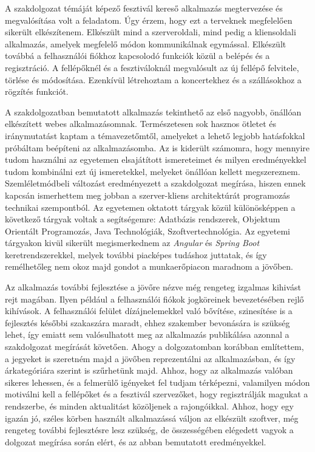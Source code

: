 
A szakdolgozat témáját képező fesztivál kereső alkalmazás megtervezése és megvalósítása volt a feladatom. Úgy érzem, hogy ezt a terveknek megfelelően sikerült elkészítenem. Elkészült mind a szerveroldali, mind pedig a kliensoldali alkalmazás, amelyek megfelelő módon kommunikálnak egymással. Elkészült továbbá a felhasználói fiókhoz kapcsolodó funkciók közül a belépés és a regisztráció. A fellépőknél és a fesztiváloknál megvalósult az új fellépő felvitele, törlése és módosítása. Ezenkívül létrehoztam a koncertekhez és a szállásokhoz a rögzítés funkciót.

A szakdolgozatban bemutatott alkalmazás tekinthető az első nagyobb, önállóan elkészített webes alkalmazásomnak. Természetesen sok hasznos ötletet és iránymutatást kaptam a témavezetőmtől, amelyeket a lehető legjobb hatásfokkal próbáltam beépíteni az alkalmazásomba. Az is kiderült számomra, hogy mennyire tudom használni az egyetemen elsajátított ismereteimet és milyen eredményekkel tudom kombinálni ezt új ismeretekkel, melyeket önállóan kellett megszereznem. Szemléletmódbeli változást eredményezett a szakdolgozat megírása, hiszen ennek kapcsán ismerhettem meg jobban a szerver-kliens architektúrát programozás technikai szempontból. Az egyetemen oktatott tárgyak közül  különösképpen a következő tárgyak voltak a segítségemre:  Adatbázis rendszerek, Objektum Orientált Programozás, Java Technológiák, Szoftvertechnológia. Az egyetemi tárgyakon kivül sikerült megismerkednem az \textit{Angular} és \textit{Spring Boot} keretrendszerekkel, melyek további piacképes tudáshoz juttatak, és így remélhetőleg nem okoz majd gondot a munkaerőpiacon maradnom a jövőben.

Az alkalmazás további fejlesztése a jövőre nézve még rengeteg izgalmas kihivást rejt magában. Ilyen például a felhasználói fiókok jogköreinek bevezetésében rejlő kihívások. A felhasználói felület dízájnelemekkel való bővítése, szinesítése is a fejlesztés későbbi szakaszára maradt, ehhez szakember bevonására is szükség lehet, így emiatt sem valósulhatott meg az alkalmazás publikálása azonnal a szakdolgozat megírását követően. Ahogy a dolgozatomban korábban említettem, a jegyeket is szeretném majd a jövőben reprezentálni az alkalmazásban, és így árkategóriára szerint is szűrhetünk majd. Ahhoz, hogy az alkalmazás valóban sikeres lehessen, és a felmerülő igényeket fel tudjam térképezni,  valamilyen módon motiválni kell a fellépőket és a fesztivál szervezőket, hogy regisztrálják magukat a rendszerbe, és minden aktualitást közöljenek a rajongóikkal. Ahhoz, hogy egy igazán jó, széles körben használt alkalmazássá váljon az elkészült szoftver, még rengeteg további fejlesztésre lesz szükség, de összességében elégedett vagyok a dolgozat megírása során elért, és az abban bemutatott eredményekkel.


